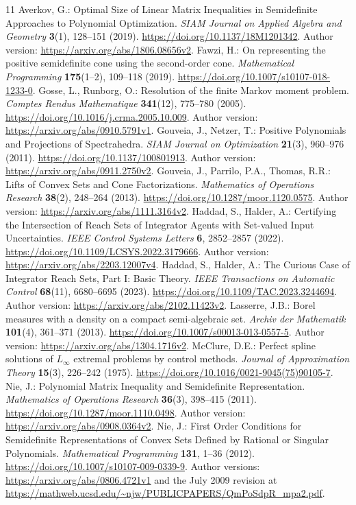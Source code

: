 \documentclass[pdflatex,sn-mathphys-num]{sn-jnl}
\theoremstyle{thmstyleone}
\theoremstyle{thmstyletwo}\newtheorem{remark}[theorem]{Remark}
\begin{document}
\begin{thebibliography}{11}
 Averkov, G.: Optimal Size of Linear Matrix Inequalities
in Semidefinite Approaches to Polynomial Optimization.
\emph{SIAM Journal on Applied Algebra and Geometry} \textbf{3}(1),
128--151 (2019).
\url{https://doi.org/10.1137/18M1201342}.
Author version: \url{https://arxiv.org/abs/1806.08656v2}.
 Fawzi, H.: On representing the positive semidefinite cone
using the second-order cone. \emph{Mathematical Programming}
\textbf{175}(1--2), 109--118 (2019).
\url{https://doi.org/10.1007/s10107-018-1233-0}.
 Gosse, L., Runborg, O.: Resolution of the finite Markov
moment problem. \emph{Comptes Rendus Mathematique} \textbf{341}(12),
775--780 (2005).
\url{https://doi.org/10.1016/j.crma.2005.10.009}.
Author version: \url{https://arxiv.org/abs/0910.5791v1}.
 Gouveia, J., Netzer, T.: Positive Polynomials and
Projections of Spectrahedra. \emph{SIAM Journal on Optimization}
\textbf{21}(3), 960--976 (2011).
\url{https://doi.org/10.1137/100801913}.
Author version: \url{https://arxiv.org/abs/0911.2750v2}.
 Gouveia, J., Parrilo, P.A., Thomas, R.R.: Lifts of Convex
Sets and Cone Factorizations. \emph{Mathematics of Operations Research}
\textbf{38}(2), 248--264 (2013).
\url{https://doi.org/10.1287/moor.1120.0575}.
Author version: \url{https://arxiv.org/abs/1111.3164v2}.
 Haddad, S., Halder, A.: Certifying the Intersection
of Reach Sets of Integrator Agents with Set-valued Input Uncertainties.
\emph{IEEE Control Systems Letters} \textbf{6}, 2852--2857 (2022).
\url{https://doi.org/10.1109/LCSYS.2022.3179666}.
Author version: \url{https://arxiv.org/abs/2203.12007v4}.
 Haddad, S., Halder, A.: The Curious Case of Integrator Reach
Sets, Part I: Basic Theory. \emph{IEEE Transactions on Automatic Control}
\textbf{68}(11), 6680--6695 (2023).
\url{https://doi.org/10.1109/TAC.2023.3244694}.
Author version: \url{https://arxiv.org/abs/2102.11423v2}.
 Lasserre, J.B.: Borel measures with a density on a compact
semi-algebraic set. \emph{Archiv der Mathematik} \textbf{101}(4),
361--371 (2013).
\url{https://doi.org/10.1007/s00013-013-0557-5}.
Author version: \url{https://arxiv.org/abs/1304.1716v2}.
 McClure, D.E.: Perfect spline solutions of $L_\infty$
extremal problems by control methods. \emph{Journal of Approximation Theory}
\textbf{15}(3), 226--242 (1975).
\url{https://doi.org/10.1016/0021-9045(75)90105-7}.
 Nie, J.: Polynomial Matrix Inequality and Semidefinite
Representation. \emph{Mathematics of Operations Research}
\textbf{36}(3), 398--415 (2011).
\url{https://doi.org/10.1287/moor.1110.0498}.
Author version: \url{https://arxiv.org/abs/0908.0364v2}.
 Nie, J.: First Order Conditions for Semidefinite
Representations of Convex Sets Defined by Rational or Singular Polynomials.
\emph{Mathematical Programming} \textbf{131}, 1--36 (2012).
\url{https://doi.org/10.1007/s10107-009-0339-9}.
Author versions: \url{https://arxiv.org/abs/0806.4721v1} and the
July 2009 revision at
\url{https://mathweb.ucsd.edu/~njw/PUBLICPAPERS/QmPoSdpR_mpa2.pdf}.
\end{thebibliography}
\end{document}
